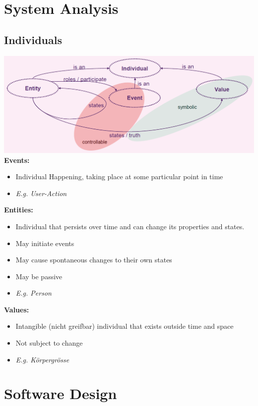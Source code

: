 \section{System Analysis}
\subsection{Individuals}
\includegraphics[width=\linewidth]{./img/value_overview.png}
\textbf{Events:}
\begin{itemize}
    \item Individual Happening, taking place at some particular point in time
    \item \textit{E.g. User-Action}
\end{itemize}
\textbf{Entities:}
\begin{itemize}
    \item Individual that persists over time and can change its properties and states.
    \item May initiate events
    \item May cause spontaneous changes to their own states
    \item May be passive
    \item \textit{E.g. Person}
\end{itemize}
\textbf{Values:}
\begin{itemize}
    \item Intangible (nicht greifbar) individual that exists outside time and space
    \item Not subject to change
    \item \textit{E.g. Körpergrösse}
\end{itemize}

\section{Software Design}
